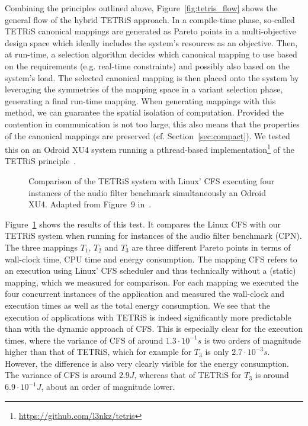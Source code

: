 Combining the principles outlined above, Figure~\ref{fig:tetris_flow} shows the general flow of the hybrid \ac{TETRiS} approach. 
In a compile-time phase, so-called \ac{TETRiS} canonical mappings are generated as Pareto points in a multi-objective design space which ideally includes the system's resources as an objective.
Then, at run-time, a selection algorithm decides which canonical mapping to use based on the requirements (e.g. real-time constraints) and possibly also based on the system's load.
The selected canonical mapping is then placed onto the system by leveraging the symmetries of the mapping space in a variant selection phase, generating a final run-time mapping.
When generating mappings with this method, we can guarantee the spatial isolation of computation.
Provided the contention in communication is not too large, this also means that the properties of the canonical mappings are preserved (cf. Section~\ref{sec:compact}).
We tested this on an Odroid XU4 system running a pthread-based implementation\footnote{\url{https://github.com/l3nkz/tetris}} of the \ac{TETRiS} principle~\cite{goens_scopes17}.

\begin{figure}[th]
	\centering
	\caption{Comparison of the TETRiS system with Linux' \acs*{CFS} executing four instances of the audio filter benchmark simultaneously an Odroid XU4. Adapted from Figure~9 in~\cite{goens_scopes17}.}
	\label{fig:tetris_experiment}
\end{figure}

Figure~\ref{fig:tetris_experiment} shows the results of this test.
It compares the Linux \ac{CFS} with our \ac{TETRiS} system when running for instances of the audio filter benchmark (\ac{CPN}).
The three mappings $T_1$, $T_2$ and $T_3$ are three different Pareto points in terms of wall-clock time, CPU time and energy consumption. 
The mapping \ac{CFS} refers to an execution using Linux' \ac{CFS} scheduler and thus technically without a (static) mapping, which we measured for comparison.
For each mapping we executed the four concurrent instances of the application and measured the wall-clock and execution times as well as the total energy consumption.
We see that the execution of applications with \ac{TETRiS} is indeed significantly more predictable than with the dynamic approach of \ac{CFS}.
This is especially clear for the execution times, where the variance of \ac{CFS} of around $1.3 \cdot 10^{-1} s$ is two orders of magnitude higher than that of \ac{TETRiS}, which for example for $T_3$ is only  $2.7 \cdot 10^{-3}s$.
However, the difference is also very clearly visible for the energy consumption. The variance of \ac{CFS} is around $2.9 J$, whereas that of \ac{TETRiS} for $T_3$ is around $6.9 \cdot 10^{-1} J$, about an order of magnitude lower.